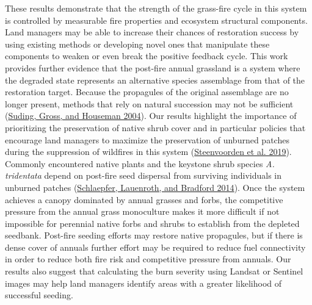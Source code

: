\documentclass[
  12pt,
]{article}
\begin{document}
These results demonstrate that the strength of the grass-fire cycle in
this system is controlled by measurable fire properties and ecosystem
structural components. Land managers may be able to increase their
chances of restoration success by using existing methods or developing
novel ones that manipulate these components to weaken or even break the
positive feedback cycle. This work provides further evidence that the
post-fire annual grassland is a system where the degraded state
represents an alternative species assemblage from that of the
restoration target. Because the propagules of the original assemblage
are no longer present, methods that rely on natural succession may not
be sufficient (\protect\hyperlink{ref-Suding2004}{Suding, Gross, and
Houseman 2004}). Our results highlight the importance of prioritizing
the preservation of native shrub cover and in particular policies that
encourage land managers to maximize the preservation of unburned patches
during the suppression of wildfires in this system
(\protect\hyperlink{ref-Steenvoorden2019}{Steenvoorden et al. 2019}).
Commonly encountered native plants and the keystone shrub species
\emph{A. tridentata} depend on post-fire seed dispersal from surviving
individuals in unburned patches
(\protect\hyperlink{ref-Schlaepfer2014}{Schlaepfer, Lauenroth, and
Bradford 2014}). Once the system achieves a canopy dominated by annual
grasses and forbs, the competitive pressure from the annual grass
monoculture makes it more difficult if not impossible for perennial
native forbs and shrubs to establish from the depleted seedbank.
Post-fire seeding efforts may restore native propagules, but if there is
dense cover of annuals further effort may be required to reduce fuel
connectivity in order to reduce both fire risk and competitive pressure
from annuals. Our results also suggest that calculating the burn
severity using Landsat or Sentinel images may help land managers
identify areas with a greater likelihood of successful seeding.
\end{document}
